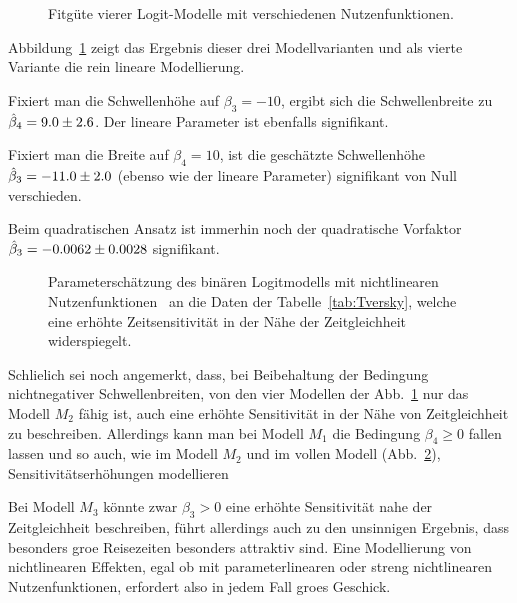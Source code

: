 \begin{figure}
  \caption{\label{fig:nonlinUtility2}Fitg\"ute vierer Logit-Modelle
    mit verschiedenen Nutzenfunktionen.
}
\end{figure}

Abbildung~\ref{fig:nonlinUtility2} zeigt das Ergebnis dieser drei
Modellvarianten und als vierte Variante die rein lineare Modellierung.
\bi
\item
Fixiert man die Schwellenh\"ohe auf $\beta_3=-10$, ergibt sich die
Schwellenbreite zu $\hat{\beta}_4=9.0 \pm 2.6$. Der lineare Parameter
ist ebenfalls signifikant. 
\item 
Fixiert man die Breite auf  $\beta_4=10$, ist
die gesch\"atzte Schwellenh\"ohe $\hat{\beta}_3=-11.0 \pm 2.0$ 
(ebenso wie der
lineare Parameter) signifikant von Null verschieden. 
\item Beim quadratischen Ansatz ist immerhin
noch der quadratische Vorfaktor $\hat{\beta}_3=-0.0062 \pm 0.0028$ signifikant. 
\ei

\begin{figure}
  \caption{\label{fig:nonlinUtilityTversky}Parametersch\"atzung des
    bin\"aren Logitmodells mit
    nichtlinearen Nutzenfunktionen~ an die Daten
    der Tabelle~\ref{tab:Tversky}, welche eine erh\"ohte
    Zeitsensitivit\"at in der N\"ahe der Zeitgleichheit widerspiegelt.
}
\end{figure}


Schlie\3lich sei noch angemerkt, dass, bei Beibehaltung der Bedingung
nichtnegativer Schwellenbreiten,  von den vier Modellen der
Abb.~\ref{fig:nonlinUtility2}  nur das
Modell $M_2$ f\"ahig ist, auch eine erh\"ohte Sensitivit\"at in
der N\"ahe von Zeitgleichheit zu beschreiben. Allerdings kann man bei
Modell $M_1$ die Bedingung $\beta_4\ge 0$ fallen lassen und so auch,
wie im Modell $M_2$ und im vollen Modell (Abb.~\ref{fig:nonlinUtilityTversky}),
Sensitivit\"atserh\"ohungen modellieren 


Bei Modell $M_3$ 
k\"onnte zwar $\beta_3>0$ eine erh\"ohte Sensitivit\"at nahe
der Zeitgleichheit beschreiben, f\"uhrt allerdings auch zu den
unsinnigen Ergebnis, dass besonders gro\3e Reisezeiten besonders
attraktiv sind. Eine Modellierung von nichtlinearen Effekten, egal ob
mit parameterlinearen oder streng nichtlinearen Nutzenfunktionen,
erfordert also in jedem Fall gro\3es Geschick.

